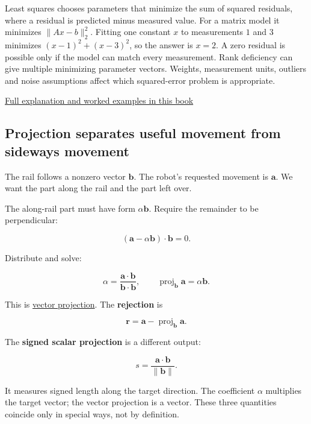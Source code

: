 \hypertarget{01-foundations-i-ch017-immediate-footing-least-squares}{}

Least squares chooses parameters that minimize the sum of squared residuals, where a residual is predicted minus measured value. For a matrix model it minimizes \(\lVert Ax-b\rVert_2^2\). Fitting one constant \(x\) to measurements \(1\) and \(3\) minimizes \((x-1)^2+(x-3)^2\), so the answer is \(x=2\). A zero residual is possible only if the model can match every measurement. Rank deficiency can give multiple minimizing parameter vectors. Weights, measurement units, outliers and noise assumptions affect which squared-error problem is appropriate.

\hyperref[01-foundations-i-ch020-qr-turns-least-squares-into-a-triangular-solve-plus-an-irreducible-residual]{Full explanation and worked examples in this book}

\subsection{Projection separates useful movement from sideways movement}\label{01-foundations-i-ch017-projection-separates-useful-movement-from-sideways-movement}

\hypertarget{01-foundations-i-ch017-projection-separates-useful-movement-from-sideways-movement}{}

The rail follows a nonzero vector \(\mathbf b\). The robot's requested movement is \(\mathbf a\). We want the part along the rail and the part left over.

The along-rail part must have form \(\alpha\mathbf b\). Require the remainder to be perpendicular:

\[
(\mathbf a-\alpha\mathbf b)\cdot\mathbf b=0.
\]

Distribute and solve:

\[
\alpha=\frac{\mathbf a\cdot\mathbf b}{\mathbf b\cdot\mathbf b},\qquad
\operatorname{proj}_{\mathbf b}\mathbf a=\alpha\mathbf b.
\]

This is \hyperref[01-foundations-i-ch017-projection-separates-useful-movement-from-sideways-movement]{vector projection}. The \textbf{rejection} is

\[
\mathbf r=\mathbf a-\operatorname{proj}_{\mathbf b}\mathbf a.
\]

The \textbf{signed scalar projection} is a different output:

\[
s=\frac{\mathbf a\cdot\mathbf b}{\|\mathbf b\|}.
\]

It measures signed length along the target direction. The coefficient \(\alpha\) multiplies the target vector; the vector projection is a vector. These three quantities coincide only in special ways, not by definition.

